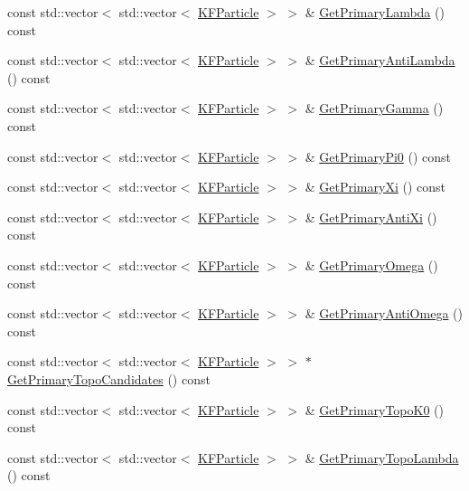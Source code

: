 \begin{DoxyCompactItemize}
\item 
const std\+::vector$<$ std\+::vector$<$ \hyperlink{classKFParticle}{K\+F\+Particle} $>$ $>$ \& \hyperlink{classKFParticleFinder_adea6f4bfdea7059a7ece5a886c8920f1}{Get\+Primary\+Lambda} () const 
\item 
const std\+::vector$<$ std\+::vector$<$ \hyperlink{classKFParticle}{K\+F\+Particle} $>$ $>$ \& \hyperlink{classKFParticleFinder_a03f9278028b47b85427d1219e3ef9727}{Get\+Primary\+Anti\+Lambda} () const 
\item 
const std\+::vector$<$ std\+::vector$<$ \hyperlink{classKFParticle}{K\+F\+Particle} $>$ $>$ \& \hyperlink{classKFParticleFinder_add1911bda416bc4a5b247b5e354e618d}{Get\+Primary\+Gamma} () const 
\item 
const std\+::vector$<$ std\+::vector$<$ \hyperlink{classKFParticle}{K\+F\+Particle} $>$ $>$ \& \hyperlink{classKFParticleFinder_ace0e71897c83d40b91f8e2e7d9c9af0b}{Get\+Primary\+Pi0} () const 
\item 
const std\+::vector$<$ std\+::vector$<$ \hyperlink{classKFParticle}{K\+F\+Particle} $>$ $>$ \& \hyperlink{classKFParticleFinder_ad9d11ee270d1863a546fe848f2ac2fff}{Get\+Primary\+Xi} () const 
\item 
const std\+::vector$<$ std\+::vector$<$ \hyperlink{classKFParticle}{K\+F\+Particle} $>$ $>$ \& \hyperlink{classKFParticleFinder_ae8ea794d79008840cf4d1e27d3ecefe5}{Get\+Primary\+Anti\+Xi} () const 
\item 
const std\+::vector$<$ std\+::vector$<$ \hyperlink{classKFParticle}{K\+F\+Particle} $>$ $>$ \& \hyperlink{classKFParticleFinder_a439ea502fca535c8bb3e39fe3cc073b9}{Get\+Primary\+Omega} () const 
\item 
const std\+::vector$<$ std\+::vector$<$ \hyperlink{classKFParticle}{K\+F\+Particle} $>$ $>$ \& \hyperlink{classKFParticleFinder_a1e1e9b86ac20223f8b74b17838256fca}{Get\+Primary\+Anti\+Omega} () const 
\item 
const std\+::vector$<$ std\+::vector$<$ \hyperlink{classKFParticle}{K\+F\+Particle} $>$ $>$ $\ast$ \hyperlink{classKFParticleFinder_af7b9f52ba3457bcf85dabd902e96fac1}{Get\+Primary\+Topo\+Candidates} () const 
\item 
const std\+::vector$<$ std\+::vector$<$ \hyperlink{classKFParticle}{K\+F\+Particle} $>$ $>$ \& \hyperlink{classKFParticleFinder_a462d3be8c69d7cad6976c5c7cbe43d85}{Get\+Primary\+Topo\+K0} () const 
\item 
const std\+::vector$<$ std\+::vector$<$ \hyperlink{classKFParticle}{K\+F\+Particle} $>$ $>$ \& \hyperlink{classKFParticleFinder_a4dc4d7b47e1db7dca24c4c8347f93e81}{Get\+Primary\+Topo\+Lambda} () const 

\end{DoxyCompactItemize}
